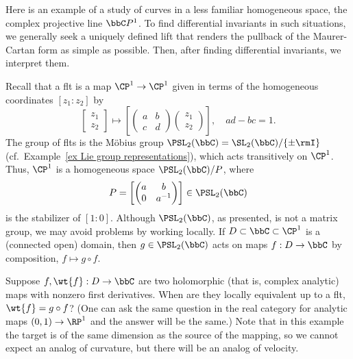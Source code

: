 \begin{example}
    Here is an example of a study of curves in a less familiar homogeneous space, the complex projective line $\bbC  P^1$. To find differential invariants in such situations, we generally seek a uniquely defined lift that renders the pullback of the Maurer-Cartan form as simple as possible. Then, after finding differential invariants, we interpret them.

    Recall that a \gls{flt} is a map $\CP^1\to \CP^1$ given in terms of the homogeneous coordinates $[z_1:z_2]$ by 
    \[
        \begin{bmatrix}
            z_1\\z_2
        \end{bmatrix}
        \mapsto \left[\begin{pmatrix}
            a & b\\
            c& d
        \end{pmatrix}
        \begin{pmatrix}
            z_1\\z_2
        \end{pmatrix}\right],\quad ad-bc=1.
    \]
    The group of \glspl{flt} is the M\"obius group $\PSL_2(\bbC)=\SL_2(\bbC)\slash \{\pm \rmI\}$ (cf.\ Example~\ref{ex Lie group representations}), which acts transitively on $\CP^1$.  Thus, $\CP^1$ is a homogeneous space $\PSL_2(\bbC)\slash P$, where 
    \[P=\left[
        \begin{pmatrix}
            a & b \\
            0 & a^{-1}
        \end{pmatrix}
    \right]\in\PSL_2(\bbC)\]
    is the stabilizer of $[1:0]$. Although $\PSL_2(\bbC)$, as presented, is not a matrix group, we may avoid problems by working locally. If $D\subset \bbC\subset\CP^1$ is a (connected open) domain, then $g\in\PSL_2(\bbC)$ acts on maps $f:D\to \bbC$ by composition, $f\mapsto g\circ f$.

    Suppose $f,\wt{f}:D\to \bbC$ are two holomorphic (that is, complex analytic) maps with nonzero first derivatives. When are they locally equivalent up to a \gls{flt}, $\wt{f}=g\circ f$? (One can ask the same question in the real category for analytic maps $(0,1)\to \RP^1$ and the answer will be the same.) Note that in this example the target is of the same dimension as the source of the mapping, so we cannot expect an analog of curvature, but there will be an analog of velocity.


\end{example}
